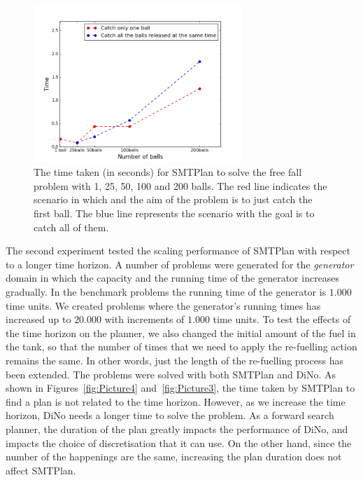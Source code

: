 \begin{figure}[!ht]
\centering
\includegraphics[width=0.70\textwidth]{diagrams/Balls.png}
\caption{The time taken (in seconds) for SMTPlan to solve the free fall problem with 1, 25, 50, 100 and 200 balls. The red line indicates the scenario in which and the aim of the problem is to just catch the first ball. The blue line represents the scenario with the goal is to catch all of them.}
\label{fig:Picture1}
\end{figure}

The second experiment tested the scaling performance of SMTPlan with respect to a longer time horizon. A number of problems were generated for the \textit{generator} domain in which the capacity and the running time of the generator increases gradually. In the benchmark problems the running time of the generator is $\num{1.000}$ time units. We created problems where the generator's running times has increased up to $\num{20.000}$ with increments of $\num{1.000}$ time units. To test the effects of the time horizon on the planner, we also changed the initial amount of the fuel in the tank, so that the number of times that we need to apply the re-fuelling action remains the same. In other words, just the length of the re-fuelling process has been extended.
The problems were solved with both SMTPlan and DiNo. 
As shown in Figures~\ref{fig:Picture4} and~\ref{fig:Picture3}, the time taken by SMTPlan to find a plan is not related to the time horizon. However, as we increase the time horizon, DiNo needs a longer time to solve the problem. As a forward search planner, the duration of the plan greatly impacts the performance of DiNo, and impacts the choice of discretisation that it can use. On the other hand, since the number of the happenings are the same, increasing the plan duration does not affect SMTPlan.

